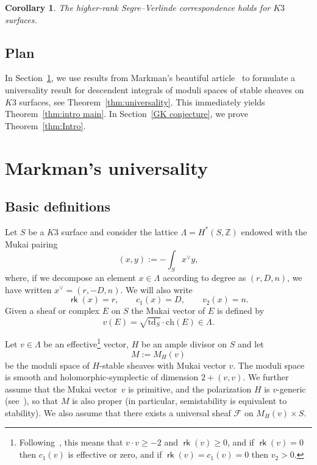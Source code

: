 \documentclass[pdftex]{sigma}
\numberwithin{equation}{section}
\newtheorem{cor}[Theorem]{Corollary}
\newcommand{\BZ}{{\mathbb{Z}}}
\newcommand{\CF}{{\mathcal F}}
\newcommand{\ch}{{\mathrm{ch}}}
\newcommand{\td}{{\mathrm{td}}}
\newcommand{\1}{\mathsf{1}}
\newcommand\rk{\operatorname{\mathsf{rk}}}
\begin{document}
\begin{cor}
The higher-rank Segre--Verlinde correspondence holds for $K3$ surfaces.
\end{cor}


\subsection{Plan}
In Section~\ref{sec:Markman universality}, we use results from Markman's beautiful article~\cite{Markman}
to formulate a universality result for descendent integrals
of moduli spaces of stable sheaves on $K3$ surfaces, see Theorem~\ref{thm:universality}.
This immediately yields Theorem~\ref{thm:intro main}.
In Section~\ref{GK conjecture}, we prove Theorem~\ref{thm:Intro}.




\section{Markman's universality} \label{sec:Markman universality}
\subsection{Basic definitions} %
Let $S$ be a $K3$ surface and consider the lattice $\Lambda = H^{\ast}(S,\BZ)$ endowed with the Mukai pairing
\[
(x , y) := - \int_S x^{\vee} y,
\]
where, if we decompose an element $x \in \Lambda$ according to degree as $(r,D,n)$, we have written $x^{\vee} = (r,-D,n)$.
We will also write
\[
\rk(x) = r, \qquad c_1(x) = D, \qquad v_2(x) = n.
\]
Given a sheaf or complex $E$ on $S$ the Mukai vector of $E$ is defined by
\[
v(E) = \sqrt{\td_S} \cdot \ch(E) \in \Lambda.
\]

Let $v \in \Lambda$ be an effective\footnote{Following~\cite[Definition 1.1]{Markman},
this means that $v \cdot v \geq -2$ and $\rk(v) \geq 0$, and if $\rk(v)=0$ then $c_1(v)$ is effective or zero, and if $\rk(v)=c_1(v)=0$ then $v_2>0$.} vector, $H$ be an ample divisor on $S$
and let
\[
M := M_H(v)
\]
be the moduli space of $H$-stable sheaves with Mukai vector $v$.
The moduli space is smooth and holomorphic-symplectic of dimension $2+(v,v)$.
We further assume that the Mukai vector~$v$ is primitive, and the polarization $H$ is $v$-generic (see~\cite[Theorem~6.2.5]{HL}),
so that $M$ is also proper (in particular, semistability is equivalent to stability).
We also assume that there exists a universal sheaf $\CF$ on $M_H(v) \times S$.
\end{document}
